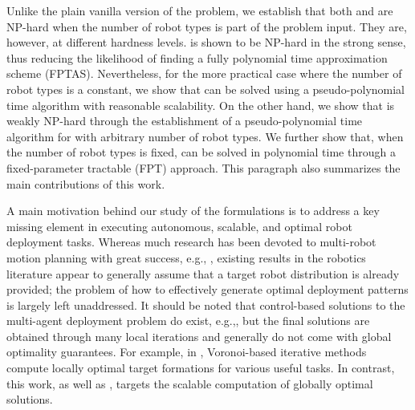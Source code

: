 Unlike the plain vanilla version of the \opg problem, we establish that both 
\opglr and \opgmc are NP-hard when the number of robot types is part of the 
problem input. They are, however, at different hardness levels. \opglr is shown 
to be NP-hard in the strong sense, thus reducing the likelihood of finding a fully
polynomial time approximation scheme (FPTAS).
Nevertheless, for the more practical case where the number of robot types 
is a constant, we show that \opglr can be solved using a pseudo-polynomial 
time algorithm with reasonable scalability. On the other hand, we show that 
\opgmc is weakly NP-hard through the establishment of a pseudo-polynomial 
time algorithm for \opgmc with arbitrary number of robot types. 
We further show that, when the number of robot types is fixed, \opgmc can be 
solved in polynomial time through a fixed-parameter tractable (FPT) approach.
This paragraph also summarizes the main contributions of this work. 

A main motivation behind our study of the \opg formulations is to address 
a key missing element in executing autonomous, scalable, and optimal robot 
deployment tasks. Whereas much research has been devoted to multi-robot 
motion planning \cite{ErdLoz86,arai2002advances} with great success, e.g., 
\cite{van2008reciprocal,smith2009monotonic,ayanian2010decentralized,turpin2014capt,
alonso2015multi,SolYu15}, existing results in the robotics literature appear 
to generally assume that a target robot distribution is already provided; the 
problem of how to effectively generate optimal deployment patterns is largely 
left unaddressed. It should be noted that control-based solutions to the 
multi-agent deployment problem do exist, e.g.,\cite{ando1999distributed,
jadbabaie2003coordination,cortes2004coverage,ren2005consensus,
schwager2009optimal,yu2012rendezvous,morgan2016swarm}, but the final solutions 
are obtained through many local iterations and generally do not come with 
global optimality guarantees. For example, in \cite{cortes2004coverage}, 
Voronoi-based iterative methods compute locally optimal target formations 
for various useful tasks. In contrast, this work, as well as 
\cite{fenghangaoyu2019efficient}, targets the scalable computation of globally optimal 
solutions. 

